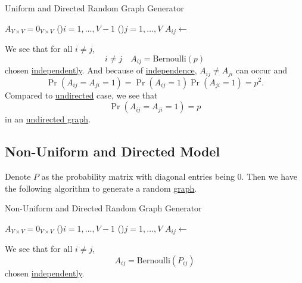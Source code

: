 \begin{algorithm}[H]\label{algo:uniform-and-directed-model-algo}
	\DontPrintSemicolon
	\caption{Uniform and Directed Random Graph Generator}
	\BlankLine

	\(A_{V\times V} = 0_{V \times V}\) 
	\;
	\For(){\(i= 1, \dots  , V-1\)}{
		\For(){\(j=1, \dots  , V\)}{
			\(A_{ij} \gets \)
		}
	}
	\;
\end{algorithm}

We see that for all \(i \neq j\),
\[
	i\neq j\quad A_{ij}= \mathrm{Bernoulli}(p)
\]
chosen \hyperref[def:independent]{independently}. And because of \hyperref[def:independent]{independence},
\(A_{ij}\neq A_{ji}\) can occur and
\[
	\Pr(A_{ij} = A_{ji} = 1) = \Pr(A_{ij} = 1) \Pr( A_{ji} = 1) = p^2.
\]
Compared to \hyperref[subsec:Uniform-and-Undirected-model]{undirected} case, we see that
\[
	\Pr(A_{ij} = A_{ji} = 1) = p
\]
in an \hyperref[def:undirected-graph]{undirected graph}.

\subsection{Non-Uniform and Directed Model}\label{subsec:non-uniform-and-directed-model}
Denote \(P\) as the probability matrix with diagonal entries being \(0\). Then we have the following algorithm to generate a random \hyperref[def:graph]{graph}.

\begin{algorithm}[H]\label{algo:non-uniform-and-directed-model-algo}
	\DontPrintSemicolon
	\caption{Non-Uniform and Directed Random Graph Generator}
	\BlankLine

	\(A_{V\times V} = 0_{V \times V}\) 
	\;
	\For(){\(i= 1, \dots  , V-1\)}{
	\For(){\(j= 1, \dots  , V\)}{
	\(A_{ij} \gets \)
	}
	}
	\;
\end{algorithm}

We see that for all \(i\neq j\),
\[
	A_{ij} = \mathrm{Bernoulli}(P_{ij})
\]
chosen \hyperref[def:independent]{independently}.

